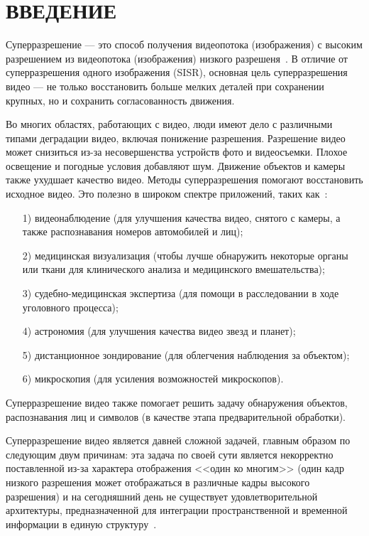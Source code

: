 \documentclass{bmstu}
\begin{document}
{\centering \chapter*{ВВЕДЕНИЕ}}

Суперразрешение --- это способ получения видеопотока (изображения) с высоким разрешением из видеопотока (изображения) низкого разрешеня~\cite{Park2003}. 
В отличие от суперразрешения одного изображения (SISR), основная цель суперразрешения видео --- не только восстановить больше мелких деталей при сохранении крупных, но и сохранить согласованность движения.

Во многих областях, работающих с видео, люди имеют дело с различными типами деградации видео, включая понижение разрешения. 
Разрешение видео может снизиться из-за несовершенства устройств фото и видеосъемки. 
Плохое освещение и погодные условия добавляют шум. 
Движение объектов и камеры также ухудшает качество видео. 
Методы суперразрешения помогают восстановить исходное видео. 
Это полезно в широком спектре приложений, таких как~\cite{Daithankar2021}:
\begin{enumerate}
\item[1)] видеонаблюдение (для улучшения качества видео, снятого с камеры, а также распознавания номеров автомобилей и лиц);
\item[2)] медицинская визуализация (чтобы лучше обнаружить некоторые органы или ткани для клинического анализа и медицинского вмешательства);
\item[3)] судебно-медицинская экспертиза (для помощи в расследовании в ходе уголовного процесса);
\item[4)] астрономия (для улучшения качества видео звезд и планет);
\item[5)] дистанционное зондирование (для облегчения наблюдения за объектом);
\item[6)] микроскопия (для усиления возможностей микроскопов).
\end{enumerate}

Суперразрешение видео также помогает решить задачу обнаружения объектов, распознавания лиц и символов (в качестве этапа предварительной обработки).

Суперразрешение видео является давней сложной задачей, главным образом по следующим двум причинам: эта задача по своей сути является некорректно поставленной из-за характера отображения <<один ко многим>> (один кадр низкого разрешения может отображаться в различные кадры высокого разрешения) и на сегодняшний день не существует удовлетворительной архитектуры, предназначенной для интеграции пространственной и временной информации в единую структуру~\cite{Xiaobin2019}.
\end{document}
